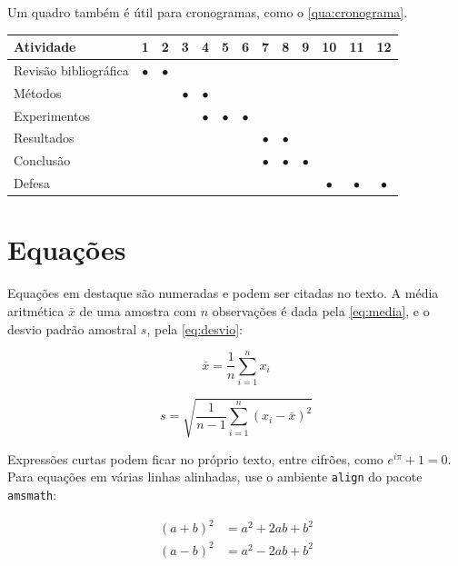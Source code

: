\documentclass[
	12pt, %
	openright, %
	oneside, %
	a4paper, %
	sumario=tradicional, %
	english, %
	brazil, %
]{abntex2}
\begin{document}
Um quadro também é útil para cronogramas, como o \autoref{qua:cronograma}.

\begin{quadro}[htbp]
	\caption{Cronograma do trabalho, em meses}\label{qua:cronograma}
	\centering
	\footnotesize
	\begin{tabular}{lcccccccccccc}
		\toprule
		\textbf{Atividade} & \textbf{1} & \textbf{2} & \textbf{3} & \textbf{4} & \textbf{5} & \textbf{6} & \textbf{7} & \textbf{8} & \textbf{9} & \textbf{10} & \textbf{11} & \textbf{12} \\
		\midrule
		Revisão bibliográfica & $\bullet$ & $\bullet$ & & & & & & & & & & \\
		Métodos & & & $\bullet$ & $\bullet$ & & & & & & & & \\
		Experimentos & & & & $\bullet$ & $\bullet$ & $\bullet$ & & & & & & \\
		Resultados & & & & & & & $\bullet$ & $\bullet$ & & & & \\
		Conclusão & & & & & & & $\bullet$ & $\bullet$ & $\bullet$ & & & \\
		Defesa & & & & & & & & & & $\bullet$ & $\bullet$ & $\bullet$ \\
		\bottomrule
	\end{tabular}
\end{quadro}

\section{Equações}\label{sec:equacoes}

Equações em destaque são numeradas e podem ser citadas no texto. A média aritmética $\bar{x}$ de uma amostra com $n$ observações é dada pela \autoref{eq:media}, e o desvio padrão amostral $s$, pela \autoref{eq:desvio}:

\begin{equation}\label{eq:media}
	\bar{x} = \frac{1}{n} \sum_{i=1}^{n} x_i
\end{equation}

\begin{equation}\label{eq:desvio}
	s = \sqrt{\frac{1}{n-1} \sum_{i=1}^{n} \left( x_i - \bar{x} \right)^2}
\end{equation}

Expressões curtas podem ficar no próprio texto, entre cifrões, como $e^{i\pi} + 1 = 0$. Para equações em várias linhas alinhadas, use o ambiente \texttt{align} do pacote \texttt{amsmath}:

\begin{align}
	(a + b)^2 &= a^2 + 2ab + b^2 \label{eq:quadrado-soma}\\
	(a - b)^2 &= a^2 - 2ab + b^2 \label{eq:quadrado-diferenca}
\end{align}
\end{document}

